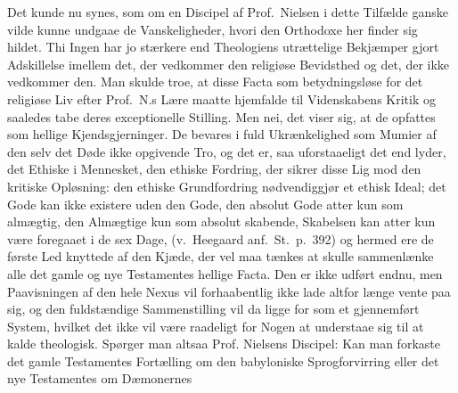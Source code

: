 Det kunde nu synes, som om en Discipel af
Prof.\ Nielsen i dette Tilfælde ganske vilde kunne undgaae de
Vanskeligheder, hvori den Orthodoxe her finder sig hildet. Thi Ingen har jo
stærkere end Theologiens utrættelige Bekjæmper gjort Adskillelse imellem det,
der vedkommer den religiøse Bevidsthed og det, der ikke vedkommer den. Man
skulde troe, at disse Facta som betydningsløse for det religiøse Liv efter
Prof.\ N.s Lære maatte hjemfalde til Videnskabens Kritik og saaledes tabe deres
exceptionelle Stilling. Men nei, det viser sig, at de opfattes som hellige
Kjendsgjerninger. De bevares i fuld Ukrænkelighed som Mumier af den selv det
Døde ikke opgivende Tro, og det er, saa uforstaaeligt det end lyder, det Ethiske
i Mennesket, den ethiske Fordring, der sikrer disse Lig mod den kritiske
Opløsning: den ethiske Grundfordring nødvendiggjør et ethisk Ideal; det Gode
kan ikke existere uden den Gode, den absolut Gode atter kun som almægtig, den
Almægtige kun som absolut skabende, Skabelsen kan atter kun være foregaaet i de
sex Dage, (v.\ Heegaard anf.\ St.\ p.\ 392) og hermed ere de første Led knyttede
af den Kjæde, der vel maa tænkes at skulle sammenlænke alle det gamle og nye
Testamentes hellige Facta. Den er ikke udført endnu, men Paavisningen af den
hele Nexus vil forhaabentlig ikke lade altfor længe vente paa sig, og den
fuldstændige Sammenstilling vil da ligge for som et gjennemført System, hvilket
det ikke vil være raadeligt for Nogen at understaae sig til at kalde
theologisk. Spørger man altsaa Prof.
Nielsens Discipel: Kan man forkaste det gamle Testamentes Fortælling
om den babyloniske Sprogforvirring eller det nye Testamentes om Dæmonernes
